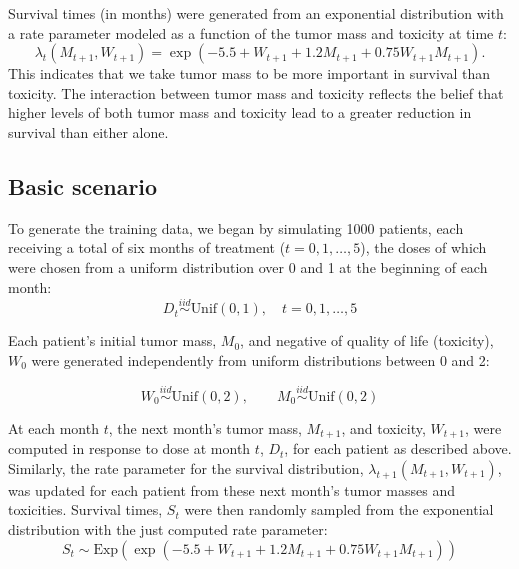 \documentclass[12pt]{article}
\begin{document}
Survival times (in months) were generated from an exponential distribution with a rate parameter modeled as a function of the tumor mass and toxicity at time $t$:
\begin{equation}
  \lambda_{t}(M_{t+1}, W_{t+1}) = \exp(-5.5 + W_{t+1} + 1.2 M_{t+1} + 0.75 W_{t+1} M_{t+1}).
\end{equation}
This indicates that we take tumor mass to be more important in survival than toxicity. The interaction between tumor mass and toxicity reflects the belief that higher levels of both tumor mass and toxicity lead to a greater reduction in survival than either alone.



\subsection{Basic scenario} %
\label{sub:basic_setup}

To generate the training data, we began by simulating 1000 patients, each receiving a total of six months of treatment ($t = 0, 1, \ldots, 5$), the doses of which were chosen from a uniform distribution over 0 and 1 at the beginning of each month:
\begin{equation}
  D_{t} \overset{iid}{\sim} \text{Unif}(0, 1), \quad t = 0, 1, \ldots, 5
\end{equation}

Each patient's initial tumor mass, $M_{0}$, and negative of quality of life (toxicity), $W_{0}$ were generated independently from uniform distributions between 0 and 2:

\begin{equation}
  W_{0} \overset{iid}{\sim} \text{Unif}(0, 2), \qquad
  M_{0} \overset{iid}{\sim} \text{Unif}(0, 2)
\end{equation}

At each month $t$, the next month's tumor mass, $M_{t + 1}$, and toxicity, $W_{t + 1}$, were computed in response to dose at month $t$, $D_{t}$, for each patient as described above. Similarly, the rate parameter for the survival distribution, $\lambda_{t+1}(M_{t + 1}, W_{t + 1})$, was updated for each patient from these next month's tumor masses and toxicities. Survival times, $S_{t}$ were then randomly sampled from the exponential distribution with the just computed rate parameter:
\begin{equation}
  S_{t} \sim \text{Exp}(\exp(-5.5 + W_{t+1} + 1.2 M_{t+1} + 0.75 W_{t+1} M_{t+1}))
\end{equation}
\end{document}
